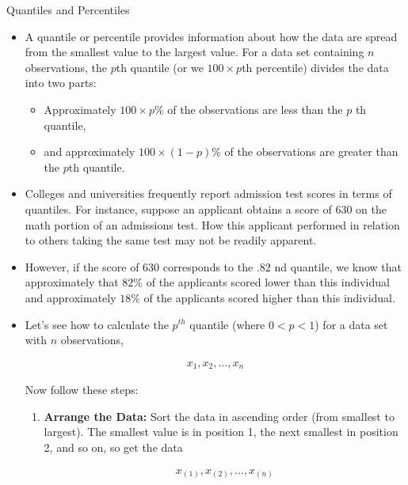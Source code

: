 \documentclass[8pt, usepdftitle=false]{beamer}
\begin{document}
\begin{frame}[allowframebreaks]{Quantiles and Percentiles}

\begin{itemize}
  
  \item A quantile or percentile provides information about how the data are spread from the smallest value to the largest value. For a data set containing $n$ observations, the $p$th quantile (or we $100 \times p$th percentile) divides the data into two parts: 

  \begin{itemize}
    \item  Approximately $100 \times p\%$ of the observations are less than the $p$ th quantile, 
    \item and approximately $100 \times (1-p) \%$ of the observations are greater than the $p$th quantile.
  \end{itemize}
 

  \item Colleges and universities frequently report admission test scores in terms of quantiles. For instance, suppose an applicant obtains a score of 630 on the math portion of an admissions test. How this applicant performed in relation to others taking the same test may not be readily apparent. 

  \item However, if the score of $630$ corresponds to the $.82$ nd quantile, we know that approximately that $82 \%$ of the applicants scored lower than this individual and approximately $18 \%$ of the applicants scored higher than this individual.

  \framebreak

  \item Let's see how to calculate the $p^{th}$ quantile (where $0<p<1$) for a data set with $n$ observations, 

    \begin{align*}
      x_{1}, x_{2}, \ldots, x_{n}
    \end{align*}

  Now follow these steps:

\medskip
\begin{enumerate}
  \item \textbf{Arrange the Data:}  
    Sort the data in ascending order (from smallest to largest). The smallest value is in position 1, the next smallest in position 2, and so on, so get the data

    \begin{align*}
      x_{(1)}, x_{(2)}, \ldots, x_{(n)}
    \end{align*}
    

\end{enumerate}
\end{itemize}
\end{frame}
\end{document}
